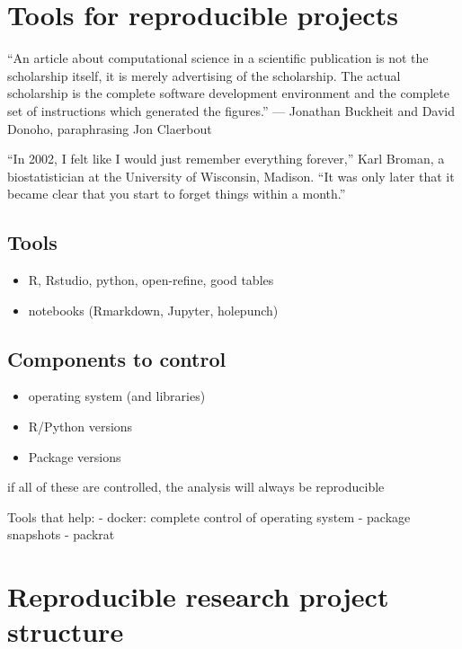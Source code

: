 \documentclass[]{book}
\providecommand{\tightlist}{%
  \setlength{\itemsep}{0pt}\setlength{\parskip}{0pt}}
\begin{document}
\hypertarget{tools-for-reproducible-projects}{%
\chapter{Tools for reproducible projects}\label{tools-for-reproducible-projects}}

``An article about computational science in a scientific publication is not the scholarship itself,
it is merely advertising of the scholarship. The
actual scholarship is the complete software development environment and the complete set
of instructions which generated the figures.''
--- Jonathan Buckheit and David Donoho,
paraphrasing Jon Claerbout

``In 2002, I felt like I would just remember everything forever,'' Karl Broman, a biostatistician at the University of Wisconsin, Madison. ``It was only later that it became clear that you start to forget things within a month.''

\hypertarget{tools}{%
\section{Tools}\label{tools}}

\begin{itemize}
\tightlist
\item
  R, Rstudio, python, open-refine, good tables
\item
  notebooks (Rmarkdown, Jupyter, holepunch)
\end{itemize}

\hypertarget{components-to-control}{%
\section{Components to control}\label{components-to-control}}

\begin{itemize}
\tightlist
\item
  operating system (and libraries)
\item
  R/Python versions
\item
  Package versions
\end{itemize}

if all of these are controlled, the analysis will always be reproducible

Tools that help:
- docker: complete control of operating system
- package snapshots
- packrat

\hypertarget{reproducible-research-project-structure}{%
\chapter{Reproducible research project structure}\label{reproducible-research-project-structure}}
\end{document}
